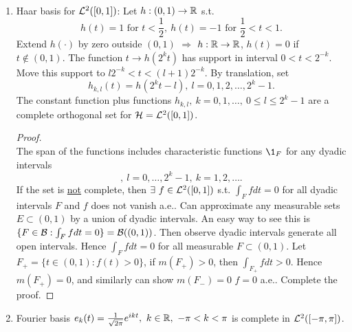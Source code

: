 \begin{examples}\
\begin{enumerate}[label = (\alph*)]
    \item Haar basis for $\mathcal{L}^2([0,1])$: Let $h: (0,1) \to \mathbb{R}$ s.t.
    \begin{equation*}
        h(t) = 1 \text{ for } t < \frac{1}{2},\ h(t) = -1 \text{ for } \frac{1}{2} < t < 1.
    \end{equation*}
     Extend $h(\cdot)$ by zero outside $(0,1)$ $\Rightarrow$ $h: \mathbb{R} \to \mathbb{R}$, $h(t) = 0$ if $t \notin (0,1)$. The function $t \to h(2^k t)$ has support in interval $0 < t < 2^{-k}$. Move this support to $l 2^{-k} < t < (l+1)2^{-k}$. By translation, set 
     $$h_{k,l} (t) = h(2^kt - l),\ l=0,1,2,\dots, 2^k -1.$$ 
     The constant function plus functions $h_{k,l},\ k=0,1,\dots,\ 0 \leq l \leq 2^k-1$ are a complete orthogonal set for $\mathcal{H} = \mathcal{L}^2([0,1])$.
    \begin{proof}\ \\
    The span of the functions includes characteristic functions $\1_F$ for any dyadic intervals \begin{equation*}
    [2^{-k} l, 2^{-k} (l+1)],\ l=0,\dots,2^{k}-1,\ k=1,2,\dots.    
    \end{equation*} 
    If the set is \underline{not} complete, then $\exists\ f \in \mathcal{L}^2([0,1])$ s.t. $\int_F f dt = 0$ for all dyadic intervals $F$ and $f$ does not vanish a.e.. Can approximate any measurable sets $E \subset (0,1)$ by a union of dyadic intervals. An easy way to see this is $\{F \in \mathcal{B}: \int_F f dt = 0\} = \mathcal{B}((0,1))$. Then observe dyadic intervals generate all open intervals. Hence $\int_F f dt = 0$ for all measurable $F \subset (0,1)$. Let $F_+ = \{t \in (0,1): f(t) > 0\}$, if $m(F_+) > 0$, then $\int_{F_+} f dt > 0$. Hence $m(F_+) = 0$, and similarly can show $m(F_-) = 0$ \imply $f = 0$ a.e.. Complete the proof. 
    \end{proof}
    
    \item Fourier basis $e_k(t) = \frac{1}{\sqrt{2\pi}} e^{ikt},\ k \in \mathbb{R},\ -\pi < k < \pi$ is complete in $\mathcal{L}^2([-\pi,\pi])$.
    

\end{enumerate}
\end{examples}
